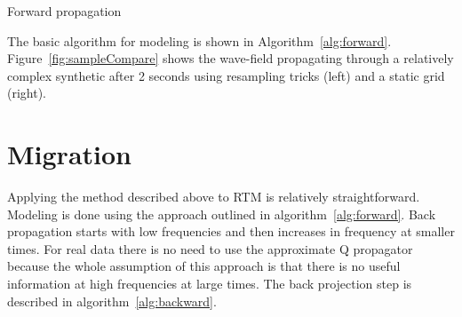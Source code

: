 \begin{algorithm} \caption{Forward propagation} \label{alg:forward}
\begin{algorithmic}[1]
\ENDIF
\ENDFOR
\ENDFOR
 \end{algorithmic}
\end{algorithm}

The basic algorithm for modeling is shown in Algorithm~\ref{alg:forward}.  Figure~\ref{fig:sampleCompare} shows the wave-field propagating through
a relatively complex synthetic after 2 seconds using resampling tricks (left) and a static grid (right).  


\section{Migration}
Applying the method described above to RTM is relatively straightforward. Modeling is done using the
approach outlined in algorithm~\ref{alg:forward}.  Back propagation starts with low frequencies
and then increases in frequency at smaller times.  For real data there is no need to 
use the approximate Q propagator because the whole assumption of this approach is that
there is no useful information at high frequencies at large times. The back projection 
step is described in algorithm~\ref{alg:backward}.

